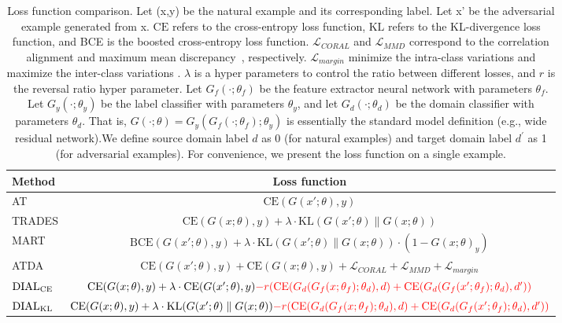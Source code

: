 \begin{table}[ht]
  \caption{Loss function comparison. Let (x,y) be the natural example and its corresponding label. Let x' be the adversarial example generated from x. $\text{CE}$ refers to the cross-entropy loss function, $\text{KL}$ refers to the KL-divergence loss function, and BCE is the boosted cross-entropy loss function. $\mathcal{L}_{CORAL}$ and $\mathcal{L}_{MMD}$ correspond to the correlation alignment and maximum mean discrepancy~\citep{borgwardt2006integrating, sun2016deep}, respectively. $\mathcal{L}_{margin}$ minimize the intra-class variations and maximize the inter-class variations \citep{song2018improving}.
  $\lambda$ is a hyper parameters to control the ratio between different losses, and $r$ is the reversal ratio hyper parameter. 
  Let $G_f(\cdot;\theta_f)$ be the feature extractor neural network with parameters $\theta_f$. Let $G_y(\cdot;\theta_y)$ be the label classifier with parameters $\theta_y$, and let $G_d(\cdot;\theta_d)$ be the domain classifier with parameters $\theta_d$. That is, $G(\cdot;\theta) = G_y(G_f(\cdot;\theta_f);\theta_y)$ is essentially the standard model definition (e.g., wide residual network).We define source domain label $d$ as 0 (for natural examples) and target domain label $d^{'}$ as 1 (for adversarial examples).
  For convenience, we present the loss function on a single example.}
  \vskip 0.1in
  \label{loss-func-comaprison}
  \centering
  \small
  \begin{tabular}{l|c}
    \toprule
    Method & Loss function \\
    \midrule
    AT & $\text{CE}(G(x';\theta),y)$ \\
    \midrule
    TRADES & $ \text{CE}(G(x;\theta),y) + \lambda \cdot \text{KL}(G(x';\theta) \parallel G(x;\theta))$ \\
    \midrule
    MART & $ 
    \text{BCE}(G(x';\theta),y) + \lambda \cdot \text{KL}(G(x';\theta) \parallel G(x;\theta))\cdot(1- G(x;\theta)_y)$ \\
    \midrule
    ATDA & $ \text{CE}(G(x';\theta),y) + \text{CE}(G(x;\theta),y) + \mathcal{L}_{CORAL} + \mathcal{L}_{MMD} + \mathcal{L}_{margin}$ \\
    \midrule
    \midrule
    $\operatorname{DIAL}_{\operatorname{CE}}$ & $\text{CE}(G(x;\theta),y) + \lambda\cdot\text{CE}(G(x';\theta),y) \textcolor{red}{-r(\text{CE}(G_d(G_f(x;\theta_f);\theta_d),d) + \text{CE}(G_d(G_f(x';\theta_f);\theta_d),d'))}$ \\
    \midrule
    $\operatorname{DIAL}_{\operatorname{KL}}$ & $\text{CE}(G(x;\theta),y) + \lambda\cdot\text{KL}(G(x';\theta) \parallel G(x;\theta)) \textcolor{red}{-r(\text{CE}(G_d(G_f(x;\theta_f);\theta_d),d) + \text{CE}(G_d(G_f(x';\theta_f);\theta_d),d'))}$ \\
    \bottomrule
  \end{tabular}
\end{table}